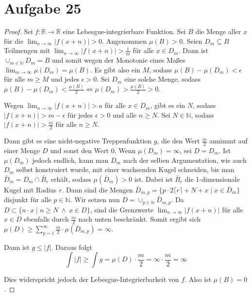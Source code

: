 \documentclass[10pt,a4paper]{article}
\begin{document}
\section{Aufgabe 25}
\begin{proof}
  Sei $f : \mathbb{R} \rightarrow \mathbb{R}$ eine Lebesgue-integrierbare Funktion.
  Sei $B$ die Menge aller $x$ für die $\lim_{n \rightarrow \infty} |f(x + n)| > 0$.
  Angenommen $\mu(B) > 0$.
  Seien $D_{m} \subseteq B$ Teilmengen mit $\lim_{n \rightarrow \infty} |f(x + n)| > \frac{1}{m}$ für alle $x \in D_{m}$.
  Dann ist $\cup_{m \in \mathbb{N}} D_{m} = B$ und somit wegen der Monotonie eines Maßes $\lim_{m \rightarrow \infty} \mu(D_{m}) = \mu(B)$.
  Es gibt also ein $M$, sodass $\mu(B) - \mu(D_{m}) < \epsilon$ für alle $m \ge M$ und jedes $\epsilon > 0$.
  Sei $D_{m}$ eine solche Menge, sodass $\mu(B) - \mu(D_{m}) < \frac{\mu(B)}{2} \Leftrightarrow \mu(D_{m}) > \frac{\mu(B)}{2} > 0$.

  Wegen $\lim_{n \rightarrow \infty} |f(x + n)| > a$ für alle $x \in D_{m}$, gibt es ein $N$, sodass $|f(x + n)| > m - \epsilon$ für jedes $\epsilon > 0$ und alle $n \ge N$.
  Sei $N \in \mathbb{N}$, sodass $|f(x + n)| > \frac{m}{2}$ für alle $n \ge N$.
  
  Dann gibt es eine nicht-negative Treppenfunktion $g$, die den Wert $\frac{m}{2}$ annimmt auf einer Menge $D$ und sonst den Wert 0.
  Wenn $\mu(D_{m}) = \infty$, sei $D = D_{m}$.
  Ist $\mu(D_{m})$ jedoch endlich, kann man $D_{m}$ nach der selben Argumentation, wie auch $D_{m}$ selbst konstruiert wurde, mit einer wachsenden Kugel schneiden, bis man $\bar{D}_{m} = D_{m} \cap \bar{B}_{r}$ erhält, sodass $\mu(\bar{D}_{m}) > 0$ ist.
  Dabei ist $\bar{B}_{r}$ die 1-dimensionale Kugel mit Radius $r$.
  Dann sind die Mengen $\bar{D}_{m, p} = \{ p \cdot 2 \lceil r \rceil + N + x \mid x \in \bar{D}_{m} \}$ disjunkt für alle $p \in \mathbb{N}$.
  Wir setzen nun $D = \cup_{p \in \mathbb{N}} \bar{D}_{m, p}$.
  Da $D \subset \{ n \cdot x \mid n \ge N\ \land\ x \in D \}$, sind die Grenzwerte $\lim_{n \rightarrow \infty} |f(x + n)|$ für alle $x \in D$ ebenfalls durch $\frac{m}{2}$ nach unten beschränkt.
  Somit ergibt sich $\mu(D) \ge \sum_{p = 1}^{\infty} \frac{m}{2} \cdot \mu(\bar{D}_{m,p}) = \infty$.
  
  Dann ist $g \le |f|$.
  Daraus folgt
  \begin{equation}
    \int |f| \ge \int g = \mu(D) \cdot \frac{m}{2} = \infty \cdot \frac{m}{2} = \infty
  \end{equation}
  
  Dies widerspricht jedoch der Lebesgue-Integrierbarkeit von $f$.
  Also ist $\mu(B) = 0$.
\end{proof}
\end{document}
